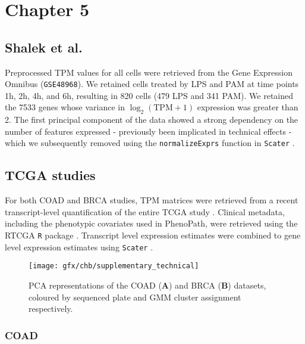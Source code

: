 \section{Chapter 5} \label{sec:prepclvm}

\subsection{Shalek et al.} \label{sec:prepshalek}

Preprocessed TPM values for all cells were retrieved from the Gene Expression Omnibus (\texttt{GSE48968}). We retained cells treated by LPS and PAM at time points 1h, 2h, 4h, and 6h, resulting in 820 cells (479 LPS and 341 PAM). We retained the 7533 genes whose variance in $\log_2(\text{TPM} + 1)$ expression was greater than 2. The first principal component of the data showed a strong dependency on the number of features expressed - previously been implicated in technical effects \cite{Hicks2015-sw}  - which we subsequently removed using the \texttt{normalizeExprs} function in \texttt{Scater} \cite{McCarthy2017-we}.

\subsection{TCGA studies}

For both COAD and BRCA studies, TPM matrices were retrieved from a recent transcript-level quantification of the entire TCGA study \cite{Tatlow2016-yo}. Clinical metadata, including the phenotypic covariates used in PhenoPath, were retrieved using the RTCGA \texttt{R} package \cite{rtcga}. Transcript level expression estimates were combined to gene level expression estimates using \texttt{Scater} \cite{McCarthy2017-we}.


\begin{figure}
  \centering
\texttt{[image: gfx/chb/supplementary\_technical]}
\caption{PCA representations of the COAD (\textbf{A}) and BRCA (\textbf{B}) datasets, coloured by sequenced plate and GMM cluster assignment respectively.} \label{fig:technical}
\end{figure}

\subsubsection{COAD}

